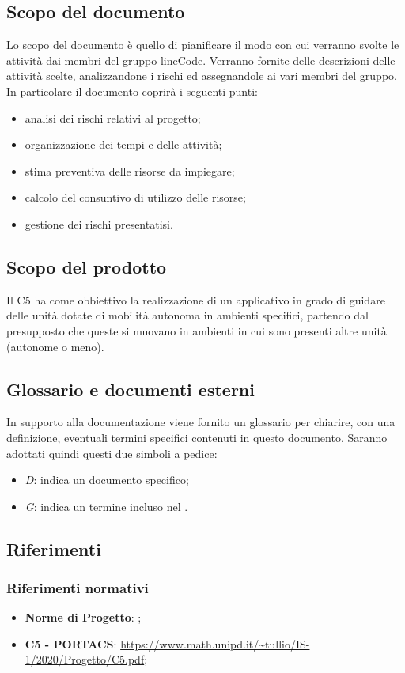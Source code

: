 \subsection{Scopo del documento}
	Lo scopo del documento è quello di pianificare il modo con cui verranno svolte le attività dai membri del gruppo lineCode. Verranno fornite delle descrizioni delle attività scelte, analizzandone i rischi ed assegnandole ai vari membri del gruppo.
	In particolare il documento coprirà i seguenti punti:
	\begin{itemize}
		\item analisi dei rischi relativi al progetto;
		\item organizzazione dei tempi e delle attività;
		\item stima preventiva delle risorse da impiegare;
		\item calcolo del consuntivo di utilizzo delle risorse;
		\item gestione dei rischi presentatisi.
	\end{itemize}

\subsection{Scopo del prodotto}
	Il  C5 ha come obbiettivo la realizzazione di un applicativo  in grado di guidare delle unità dotate di mobilità autonoma in ambienti specifici, partendo dal presupposto che queste si muovano in ambienti in cui sono presenti altre unità (autonome o meno).

\subsection{Glossario e documenti esterni}
	In supporto alla documentazione viene fornito un glossario per chiarire, con una definizione, eventuali termini specifici contenuti in questo documento.
	Saranno adottati quindi questi due simboli a pedice:
	\begin{itemize}
		\item \textit{D}: indica un documento specifico;
		\item \textit{G}: indica un termine incluso nel .
	\end{itemize}

\subsection{Riferimenti}
	\subsubsection{Riferimenti normativi}
	\begin{itemize}
		\item \textbf{Norme di Progetto}: ;
		\item \textbf{{ C5 - PORTACS}}: \url{https://www.math.unipd.it/~tullio/IS-1/2020/Progetto/C5.pdf};
	\end{itemize}
